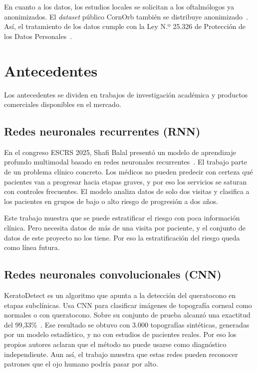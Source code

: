         En cuanto a los datos, los estudios locales se solicitan a los oftalmólogos ya anonimizados. El \textit{dataset} público CornOrb también se distribuye anonimizado~\cite{zenodo}. Así, el tratamiento de los datos cumple con la Ley N.º 25.326 de Protección de los Datos Personales~\cite{ley_25326}.

\section{Antecedentes}

    Los antecedentes se dividen en trabajos de investigación académica y productos comerciales disponibles en el mercado.

    \subsection*{Redes neuronales recurrentes (RNN)}

        En el congreso ESCRS 2025, Shafi Balal presentó un modelo de aprendizaje profundo multimodal basado en redes neuronales recurrentes~\cite{shafi_balal}. El trabajo parte de un problema clínico concreto. Los médicos no pueden predecir con certeza qué pacientes van a progresar hacia etapas graves, y por eso los servicios se saturan con controles frecuentes. El modelo analiza datos de solo dos visitas y clasifica a los pacientes en grupos de bajo o alto riesgo de progresión a dos años.

        Este trabajo muestra que se puede estratificar el riesgo con poca información clínica. Pero necesita datos de más de una visita por paciente, y el conjunto de datos de este proyecto no los tiene. Por eso la estratificación del riesgo queda como línea futura.

    \subsection*{Redes neuronales convolucionales (CNN)}

        KeratoDetect es un algoritmo que apunta a la detección del queratocono en etapas subclínicas. Usa CNN para clasificar imágenes de topografía corneal como normales o con queratocono. Sobre su conjunto de prueba alcanzó una exactitud del 99,33\%~\cite{kerato_detect}. Ese resultado se obtuvo con 3.000 topografías sintéticas, generadas por un modelo estadístico, y no con estudios de pacientes reales. Por eso los propios autores aclaran que el método no puede usarse como diagnóstico independiente. Aun así, el trabajo muestra que estas redes pueden reconocer patrones que el ojo humano podría pasar por alto.

